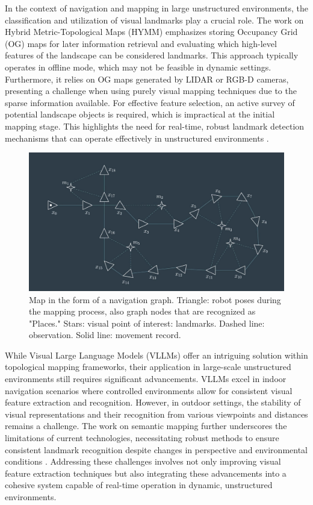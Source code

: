 \documentclass[runningheads]{llncs}
\begin{document}
In the context of navigation and mapping in large unstructured environments, the classification and utilization of visual landmarks play a crucial role. The work on Hybrid Metric-Topological Maps (HYMM) emphasizes storing Occupancy Grid (OG) maps for later information retrieval and evaluating which high-level features of the landscape can be considered landmarks. This approach typically operates in offline mode, which may not be feasible in dynamic settings. Furthermore, it relies on OG maps generated by LIDAR or RGB-D cameras, presenting a challenge when using purely visual mapping techniques due to the sparse information available. For effective feature selection, an active survey of potential landscape objects is required, which is impractical at the initial mapping stage. This highlights the need for real-time, robust landmark detection mechanisms that can operate effectively in unstructured environments \cite{Navigation_Large_Unstructured_environments}.


\begin{figure}
    \centering
    \includegraphics[width=0.8\linewidth]{img/pose-landmark-graph.png}
    \caption{Map in the form of a navigation graph. Triangle: robot poses during the mapping process, also graph nodes that are recognized as "Places."
    Stars: visual point of interest: landmarks. Dashed line: observation. Solid line: movement record. }
    \label{fig:pose-landmark-graph}
\end{figure}

While Visual Large Language Models (VLLMs) offer an intriguing solution within topological mapping frameworks, their application in large-scale unstructured environments still requires significant advancements. VLLMs excel in indoor navigation scenarios where controlled environments allow for consistent visual feature extraction and recognition. However, in outdoor settings, the stability of visual representations and their recognition from various viewpoints and distances remains a challenge. The work on semantic mapping further underscores the limitations of current technologies, necessitating robust methods to ensure consistent landmark recognition despite changes in perspective and environmental conditions \cite{RangeSensorsEvalutation}. Addressing these challenges involves not only improving visual feature extraction techniques but also integrating these advancements into a cohesive system capable of real-time operation in dynamic, unstructured environments.
\end{document}
